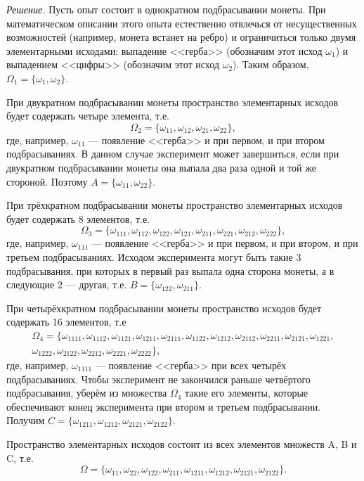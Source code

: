 \textit{Решение.}  Пусть опыт состоит в однократном подбрасывании монеты.
При математическом описании этого опыта естественно отвлечься от несущественных возможностей
(например, монета встанет на ребро) и ограничиться только двумя элементарными исходами:
выпадение <<герба>> (обозначим этот исход $ \omega_1 $) и выпадением <<цифры>> (обозначим этот исход $ \omega_2 $).
Таким образом, $ \Omega_1 = \{ \omega_1, \omega_2 \} $.

При двукратном подбрасывании монеты пространство элементарных исходов будет содержать четыре элемента, т.е.
$$ \Omega_2 = \{ \omega_{11}, \omega_{12}, \omega_{21}, \omega_{22} \},$$
где, например, $ \omega_{11} $ --- появление <<герба>> и при первом, и при втором подбрасываниях.
В данном случае эксперимент может завершиться, если при двукратном подбрасывании монеты она выпала два раза одной и той же стороной.
Поэтому $ A = \{ \omega_{11}, \omega_{22} \} $.

При трёхкратном подбрасывании монеты пространство элементарных исходов будет содержать 8 элементов, т.е.
$$ \Omega_3 =
\{ \omega_{111}, \omega_{112}, \omega_{122}, \omega_{121}, \omega_{211}, \omega_{221}, \omega_{212}, \omega_{222} \},$$
где, например, $ \omega_{111} $ --- появление <<герба>> и при первом, и при втором, и при третьем подбрасываниях.
Исходом эксперимента могут быть такие 3 подбрасывания, при которых в первый раз выпала одна сторона монеты, а в следующие 2 --- другая, т.е.
$ B = \{ \omega_{122}, \omega_{211} \} $.

При четырёхкратном подбрасывании монеты пространство исходов будет содержать 16 элементов, т.е
\begin{equation*}
\begin{split}
\Omega_4 =
\{ \omega_{1111}, \omega_{1112}, \omega_{1121}, \omega_{1211}, \omega_{2111}, \omega_{1122}, \omega_{1212}, \omega_{2112}, \omega_{2211}, \omega_{2121}, \omega_{1221}, \\
\omega_{1222}, \omega_{2122}, \omega_{2212}, \omega_{2221}, \omega_{2222}\},
\end{split}
\end{equation*}
где, например, $ \omega_{1111} $ --- появление <<герба>> при всех четырёх подбрасываниях.
Чтобы эксперимент не закончился раньше четвёртого подбрасывания, уберём из множества
$ \Omega_4 $ такие его элементы, которые обеспечивают конец эксперимента при втором и третьем подбрасывании.
Получим $ C = \{ \omega_{1211}, \omega_{1212}, \omega_{2121}, \omega_{2122} \} $.

Пространство элементарных исходов состоит из всех элементов множеств A, B и C, т.е.
$$ \Omega =
\{ \omega_{11}, \omega_{22}, \omega_{122}, \omega_{211}, \omega_{1211}, \omega_{1212}, \omega_{2121}, \omega_{2122} \}.$$

